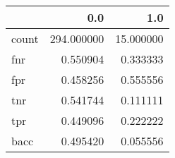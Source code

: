 \begin{tabular}{lrr}
\toprule
{} &         0.0 &        1.0 \\
\midrule
count &  294.000000 &  15.000000 \\
fnr   &    0.550904 &   0.333333 \\
fpr   &    0.458256 &   0.555556 \\
tnr   &    0.541744 &   0.111111 \\
tpr   &    0.449096 &   0.222222 \\
bacc  &    0.495420 &   0.055556 \\
\bottomrule
\end{tabular}
